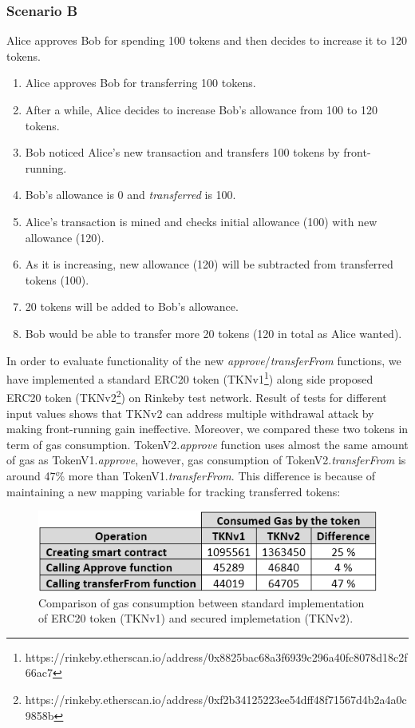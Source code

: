 \subsubsection*{Scenario B} Alice approves Bob for spending 100 tokens and then decides to increase it to 120 tokens.
\begin{enumerate}
	\item Alice approves Bob for transferring 100 tokens.
	\item After a while, Alice decides to increase Bob’s allowance from 100 to 120 tokens.
	\item Bob noticed Alice’s new transaction and transfers 100 tokens by front-running.
	\item Bob’s allowance is 0 and \textit{transferred} is 100.
	\item Alice’s transaction is mined and checks initial allowance (100) with new allowance (120).
	\item As it is increasing, new allowance (120) will be subtracted from transferred tokens (100).
	\item 20 tokens will be added to Bob’s allowance.
	\item Bob would be able to transfer more 20 tokens (120 in total as Alice wanted).\newline
\end{enumerate}

In order to evaluate functionality of the new \textit{approve}/\textit{transferFrom} functions, we have implemented a standard ERC20 token (TKNv1\footnote{https://rinkeby.etherscan.io/address/0x8825bac68a3f6939c296a40fc8078\newline d18c2f66ac7}) along side proposed ERC20 token (TKNv2\footnote{https://rinkeby.etherscan.io/address/0xf2b34125223ee54dff48f71567d4b\newline 2a4a0c9858b}) on Rinkeby test network. Result of tests for different input values shows that TKNv2 can address multiple withdrawal attack by making front-running gain ineffective. Moreover, we compared these two tokens in term of gas consumption. TokenV2.\textit{approve} function uses almost the same amount of gas as TokenV1.\textit{approve}, however, gas consumption of TokenV2.\textit{transferFrom} is around 47\% more than TokenV1.\textit{transferFrom}. This difference is because of maintaining a new mapping variable for tracking transferred tokens:

\begin{figure}[t]
	\centering
	\includegraphics[width=1.0\linewidth]{figures/multiple_withdrawal_22.png}
	\caption{Comparison of gas consumption between standard implementation of ERC20 token (TKNv1) and secured implemetation (TKNv2).}
\end{figure}

